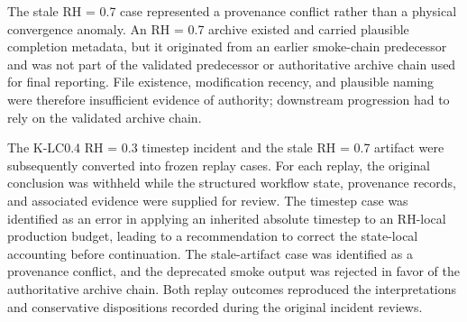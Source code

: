 The stale RH = 0.7 case represented a provenance conflict rather than a physical convergence anomaly. An RH = 0.7 archive existed and carried plausible completion metadata, but it originated from an earlier smoke-chain predecessor and was not part of the validated predecessor or authoritative archive chain used for final reporting. File existence, modification recency, and plausible naming were therefore insufficient evidence of authority; downstream progression had to rely on the validated archive chain.

The K-LC0.4 RH = 0.3 timestep incident and the stale RH = 0.7 artifact were subsequently converted into frozen replay cases. For each replay, the original conclusion was withheld while the structured workflow state, provenance records, and associated evidence were supplied for review. The timestep case was identified as an error in applying an inherited absolute timestep to an RH-local production budget, leading to a recommendation to correct the state-local accounting before continuation. The stale-artifact case was identified as a provenance conflict, and the deprecated smoke output was rejected in favor of the authoritative archive chain. Both replay outcomes reproduced the interpretations and conservative dispositions recorded during the original incident reviews.

